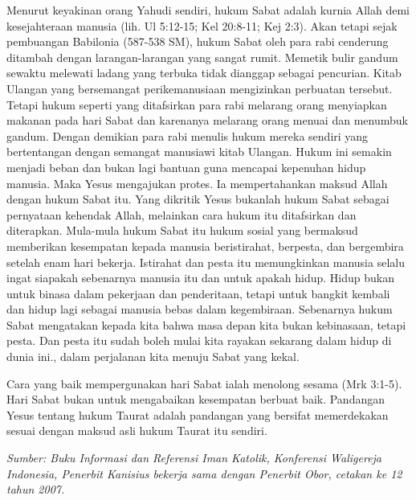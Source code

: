 	Menurut keyakinan orang Yahudi sendiri, hukum Sabat adalah kurnia Allah demi kesejahteraan manusia (lih. Ul 5:12-15; Kel 20:8-11; Kej 2:3). Akan tetapi sejak pembuangan Babilonia (587-538 SM),  hukum Sabat oleh para rabi cenderung ditambah dengan larangan-larangan yang sangat rumit. Memetik bulir gandum sewaktu melewati ladang yang terbuka tidak dianggap sebagai pencurian. Kitab Ulangan yang bersemangat perikemanusiaan mengizinkan perbuatan tersebut. Tetapi hukum seperti yang ditafsirkan para rabi melarang orang menyiapkan makanan pada hari Sabat dan karenanya melarang orang menuai dan menumbuk gandum. Dengan demikian para rabi menulis hukum mereka sendiri yang bertentangan dengan semangat manusiawi kitab Ulangan. Hukum ini semakin menjadi beban dan bukan lagi bantuan guna mencapai kepenuhan hidup manusia. Maka Yesus mengajukan protes. Ia mempertahankan maksud Allah dengan hukum Sabat itu. Yang dikritik Yesus bukanlah hukum Sabat sebagai pernyataan kehendak Allah, melainkan cara hukum itu ditafsirkan dan diterapkan. Mula-mula hukum Sabat  itu hukum sosial yang bermaksud memberikan kesempatan kepada manusia beristirahat, berpesta, dan bergembira setelah enam hari bekerja. Istirahat dan pesta itu memungkinkan manusia selalu ingat siapakah sebenarnya manusia itu dan untuk apakah hidup. Hidup bukan untuk binasa dalam pekerjaan dan penderitaan, tetapi untuk bangkit kembali dan hidup lagi sebagai manusia bebas dalam kegembiraan. Sebenarnya hukum Sabat mengatakan kepada kita bahwa masa depan kita bukan kebinasaan, tetapi pesta. Dan pesta itu sudah boleh mulai kita rayakan sekarang dalam hidup di dunia ini., dalam perjalanan kita menuju Sabat yang kekal.

	Cara yang baik mempergunakan hari Sabat ialah menolong sesama (Mrk 3:1-5). Hari Sabat bukan untuk mengabaikan kesempatan berbuat baik. Pandangan Yesus tentang hukum Taurat adalah pandangan yang bersifat memerdekakan sesuai dengan maksud asli hukum Taurat itu sendiri.  


\emph{Sumber: Buku Informasi dan Referensi  Iman Katolik, Konferensi Waligereja Indonesia, Penerbit Kanisius bekerja sama dengan Penerbit Obor, cetakan ke 12 tahun 2007.}